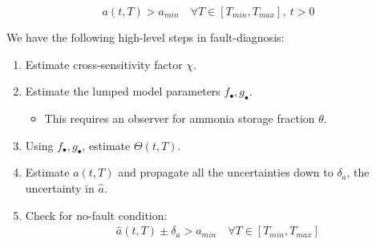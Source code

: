 $$ a(t, T) > a_{min} \quad \forall T \in [T_{min}, T_{max}], \: t > 0$$

\bigskip

We have the following high-level steps in fault-diagnosis:
\begin{enumerate}
    \item Estimate cross-sensitivity factor $\chi$.
    \item Estimate the lumped model parameters $f_{\bullet}, g_{\bullet}$.
    \begin{itemize}
        \item This requires an observer for ammonia storage fraction $\theta$.
    \end{itemize}
    \item Using $f_{\bullet}, g_{\bullet}$, estimate $\Theta(t, T)$.
\item Estimate $a(t, T)$ and propagate all the uncertainties down to $\delta_a$,
the uncertainty in $\hat a$.
\item Check for no-fault condition:
\begin{align*}
    \hat a(t, T) \pm \delta_a > a_{min} \quad \forall T \in [T_{min}, T_{max}]
\end{align*}
\end{enumerate}
